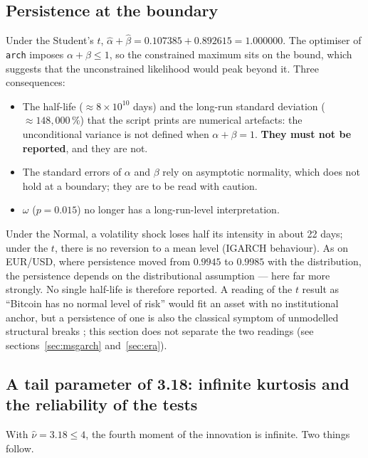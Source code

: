 \documentclass[12pt,a4paper]{article}
\begin{document}
\subsection{Persistence at the boundary}
\label{sec:garch-igarch}

Under the Student's $t$, $\hat\alpha + \hat\beta = 0.107385 + 0.892615 = 1.000000$. The optimiser of \texttt{arch} imposes $\alpha+\beta \le 1$, so the constrained maximum sits on the bound, which suggests that the unconstrained likelihood would peak beyond it. Three consequences:
\begin{itemize}
	\item The half-life ($\approx 8\times10^{10}$ days) and the long-run standard deviation ($\approx 148{,}000\,\%$) that the script prints are numerical artefacts: the unconditional variance is not defined when $\alpha+\beta=1$. \textbf{They must not be reported}, and they are not.
	\item The standard errors of $\alpha$ and $\beta$ rely on asymptotic normality, which does not hold at a boundary; they are to be read with caution.
	\item $\omega$ ($p=0.015$) no longer has a long-run-level interpretation.
\end{itemize}

\begin{econbox}
	Under the Normal, a volatility shock loses half its intensity in about 22 days; under the $t$, there is no reversion to a mean level (IGARCH behaviour). As on EUR/USD, where persistence moved from $0.9945$ to $0.9985$ with the distribution, the persistence depends on the distributional assumption --- here far more strongly. No single half-life is therefore reported. A reading of the $t$ result as ``Bitcoin has no normal level of risk'' would fit an asset with no institutional anchor, but a persistence of one is also the classical symptom of unmodelled structural breaks \citep{lamoureuxlastrapes1990}; this section does not separate the two readings (see sections~\ref{sec:msgarch} and~\ref{sec:era}).
\end{econbox}

\subsection{A tail parameter of 3.18: infinite kurtosis and the reliability of the tests}

With $\hat\nu = 3.18 \le 4$, the fourth moment of the innovation is infinite. Two things follow.
\end{document}

